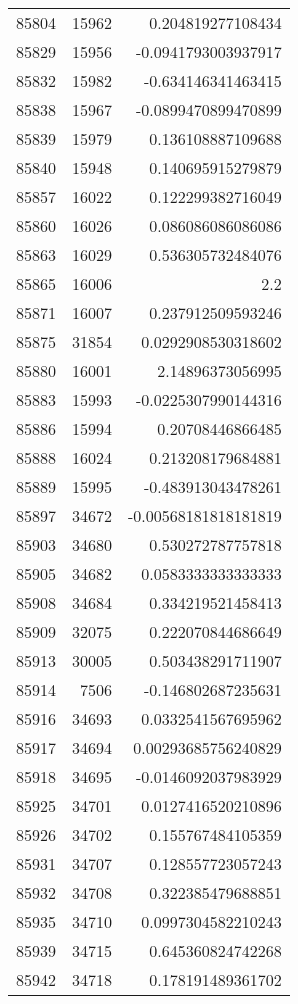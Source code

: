 \begin{tabular}{r | r | r}
85804 & 15962 & 0.204819277108434 \\
85829 & 15956 & -0.0941793003937917 \\
85832 & 15982 & -0.634146341463415 \\
85838 & 15967 & -0.0899470899470899 \\
85839 & 15979 & 0.136108887109688 \\
85840 & 15948 & 0.140695915279879 \\
85857 & 16022 & 0.122299382716049 \\
85860 & 16026 & 0.086086086086086 \\
85863 & 16029 & 0.536305732484076 \\
85865 & 16006 & 2.2 \\
85871 & 16007 & 0.237912509593246 \\
85875 & 31854 & 0.0292908530318602 \\
85880 & 16001 & 2.14896373056995 \\
85883 & 15993 & -0.0225307990144316 \\
85886 & 15994 & 0.20708446866485 \\
85888 & 16024 & 0.213208179684881 \\
85889 & 15995 & -0.483913043478261 \\
85897 & 34672 & -0.00568181818181819 \\
85903 & 34680 & 0.530272787757818 \\
85905 & 34682 & 0.0583333333333333 \\
85908 & 34684 & 0.334219521458413 \\
85909 & 32075 & 0.222070844686649 \\
85913 & 30005 & 0.503438291711907 \\
85914 & 7506 & -0.146802687235631 \\
85916 & 34693 & 0.0332541567695962 \\
85917 & 34694 & 0.00293685756240829 \\
85918 & 34695 & -0.0146092037983929 \\
85925 & 34701 & 0.0127416520210896 \\
85926 & 34702 & 0.155767484105359 \\
85931 & 34707 & 0.128557723057243 \\
85932 & 34708 & 0.322385479688851 \\
85935 & 34710 & 0.0997304582210243 \\
85939 & 34715 & 0.645360824742268 \\
85942 & 34718 & 0.178191489361702 \\

\end{tabular}

